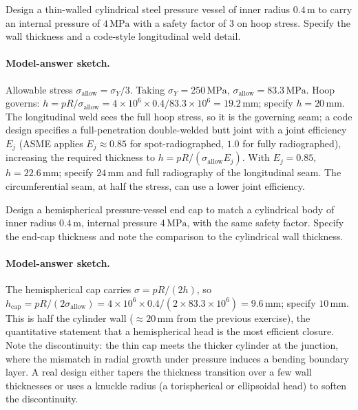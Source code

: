 \begin{exercise}
Design a thin-walled cylindrical steel pressure vessel of inner
radius $0.4\,\si{\meter}$ to carry an internal pressure of $4\,
\text{MPa}$ with a safety factor of $3$ on hoop stress. Specify
the wall thickness and a code-style longitudinal weld detail.

\paragraph{Model-answer sketch.} Allowable stress $\sigma_{\text{allow}}
= \sigma_Y/3$. Taking $\sigma_Y = 250\,\text{MPa}$, $\sigma_{\text{
allow}} = 83.3\,\text{MPa}$. Hoop governs: $h = pR/\sigma_{\text{allow}}
= 4\times 10^6\times 0.4/83.3\times 10^6 = 19.2\,\si{\milli\meter}$;
specify $h = 20\,\si{\milli\meter}$. The longitudinal weld sees the
full hoop stress, so it is the governing seam; a code design specifies
a full-penetration double-welded butt joint with a joint efficiency
$E_j$ (ASME applies $E_j \approx 0.85$ for spot-radiographed,
$1.0$ for fully radiographed), increasing the required thickness to
$h = pR/(\sigma_{\text{allow}}E_j)$. With $E_j = 0.85$, $h = 22.6\,
\si{\milli\meter}$; specify $24\,\si{\milli\meter}$ and full
radiography of the longitudinal seam. The circumferential seam, at
half the stress, can use a lower joint efficiency.
\end{exercise}

\begin{exercise}
Design a hemispherical pressure-vessel end cap to match a
cylindrical body of inner radius $0.4\,\si{\meter}$, internal
pressure $4\,\text{MPa}$, with the same safety factor. Specify
the end-cap thickness and note the comparison to the cylindrical
wall thickness.

\paragraph{Model-answer sketch.} The hemispherical cap carries $\sigma
= pR/(2h)$, so $h_{\text{cap}} = pR/(2\sigma_{\text{allow}}) = 4\times
10^6\times 0.4/(2\times 83.3\times 10^6) = 9.6\,\si{\milli\meter}$;
specify $10\,\si{\milli\meter}$. This is half the cylinder wall
($\approx 20\,\si{\milli\meter}$ from the previous exercise), the
quantitative statement that a hemispherical head is the most efficient
closure. Note the discontinuity: the thin cap meets the thicker
cylinder at the junction, where the mismatch in radial growth under
pressure induces a bending boundary layer. A real design either tapers
the thickness transition over a few wall thicknesses or uses a knuckle
radius (a torispherical or ellipsoidal head) to soften the
discontinuity.
\end{exercise}

